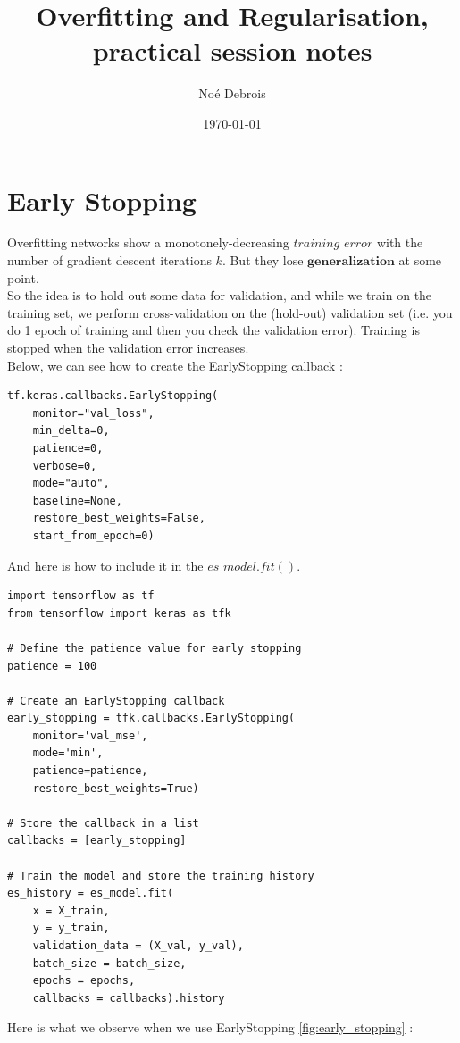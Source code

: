\documentclass[a4paper,12pt]{article}
\title{Overfitting and Regularisation, practical session notes}
\author{Noé Debrois}
\date{\today}
\begin{document}
\maketitle

\tableofcontents

\section{Early Stopping}

Overfitting networks show a monotonely-decreasing $\textit{training error}$ with the number of gradient descent iterations $k$. But they lose $\textbf{generalization}$ at some point.\\

So the idea is to hold out some data for validation, and while we train on the training set, we perform cross-validation on the (hold-out) validation set (i.e. you do 1 epoch of training and then you check the validation error). Training is stopped when the validation error increases.\\

Below, we can see how to create the EarlyStopping callback :

\begin{verbatim}
tf.keras.callbacks.EarlyStopping(
    monitor="val_loss",
    min_delta=0,
    patience=0,
    verbose=0,
    mode="auto",
    baseline=None,
    restore_best_weights=False,
    start_from_epoch=0)
\end{verbatim}

And here is how to include it in the $es\_model.fit()$. 

\begin{verbatim}
import tensorflow as tf
from tensorflow import keras as tfk

# Define the patience value for early stopping
patience = 100

# Create an EarlyStopping callback
early_stopping = tfk.callbacks.EarlyStopping(
    monitor='val_mse',
    mode='min',
    patience=patience,
    restore_best_weights=True)

# Store the callback in a list
callbacks = [early_stopping]

# Train the model and store the training history
es_history = es_model.fit(
    x = X_train,
    y = y_train,
    validation_data = (X_val, y_val),
    batch_size = batch_size,
    epochs = epochs,
    callbacks = callbacks).history
\end{verbatim}

Here is what we observe when we use EarlyStopping \ref{fig:early_stopping} :
\end{document}
